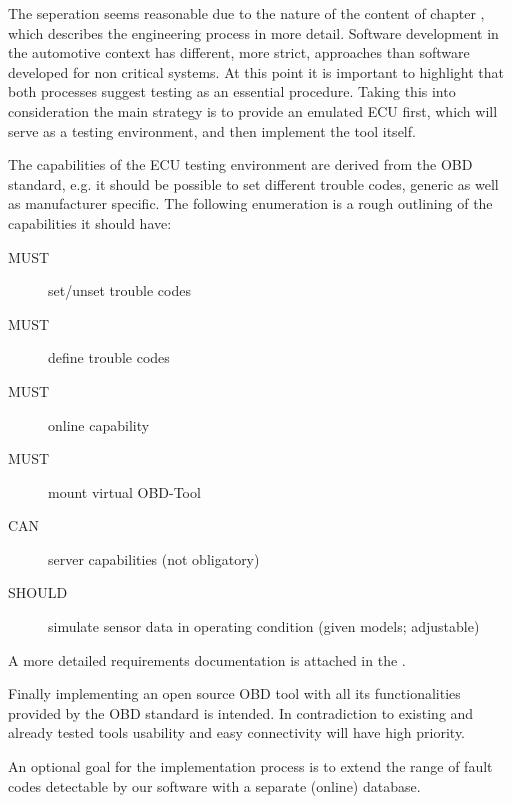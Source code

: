 The seperation seems reasonable due to the nature of the content of chapter  
, which describes the engineering process in more detail. Software development in the automotive context has different, more
strict, approaches than software developed for non critical systems.
At this point it is important to highlight that both processes suggest
testing as an essential procedure. Taking this into
consideration the main strategy is to provide an emulated ECU first,
which will serve as a testing environment, and then implement the tool
itself.

The capabilities of the ECU testing environment are derived from the
OBD standard, e.g. it should be possible to set different trouble codes,
generic as well as manufacturer specific. The following enumeration is
a rough outlining of the capabilities it should have:

\begin{description}
\item[MUST]   set/unset trouble codes
\item[MUST]   define trouble codes
\item[MUST]   online capability
\item[MUST]   mount virtual OBD-Tool
\item[CAN]    server capabilities (not obligatory)
\item[SHOULD] simulate sensor data in operating condition (given models;
  adjustable)
\end{description}

A more detailed requirements documentation is attached in the .

Finally implementing an open source OBD tool with all its
functionalities provided by the OBD standard is
intended. In contradiction to existing and already tested tools usability and easy
connectivity will have high priority.

An optional goal for the implementation process is to extend the range
of fault codes detectable by our software with a separate (online)
database.

